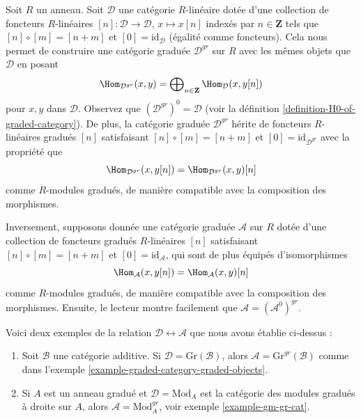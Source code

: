 \begin{remark}
\label{remark-graded-shift-functors}
Soit $R$ un anneau. Soit $\mathcal{D}$ une catégorie $R$-linéaire dotée d'une
collection de foncteurs $R$-linéaires $[n] : \mathcal{D} \to \mathcal{D}$, $x
\mapsto x[n]$ indexés par $n \in \mathbf{Z}$ tels que $[n]
\circ [m] = [n + m]$ et $[0] = \text{id}_\mathcal{D}$ (égalité comme
foncteurs). Cela nous permet de construire une catégorie graduée $\mathcal{D}^{gr}$ sur
$R$ avec les mêmes objets que $\mathcal{D}$ en posant
$$
\Hom_{\mathcal{D}^{gr}}(x, y) =
\bigoplus\nolimits_{n \in \mathbf{Z}} \Hom_\mathcal{D}(x, y[n])
$$
pour $x, y$ dans $\mathcal{D}$. Observez que $(\mathcal{D}^{gr})^0 = \mathcal{D}$
(voir la définition \ref{definition-H0-of-graded-category}). De plus, la catégorie
graduée $\mathcal{D}^{gr}$ hérite de foncteurs $R$-linéaires gradués
$[n]$ satisfaisant $[n] \circ [m] = [n + m]$ et $[0] = \text{id}_{\mathcal{D}^{gr}}$
avec la propriété que
$$
\Hom_{\mathcal{D}^{gr}}(x, y[n]) = \Hom_{\mathcal{D}^{gr}}(x, y)[n]
$$
comme $R$-modules gradués, de manière compatible avec la composition des morphismes.

\medskip\noindent
Inversement, supposons donnée une catégorie graduée $\mathcal{A}$ sur $R$
dotée d'une collection de foncteurs gradués $R$-linéaires
$[n]$ satisfaisant $[n] \circ [m] = [n + m]$ et $[0] =
\text{id}_\mathcal{A}$, qui sont de plus équipés d'isomorphismes
$$
\Hom_\mathcal{A}(x, y[n]) = \Hom_\mathcal{A}(x, y)[n]
$$
comme $R$-modules gradués, de manière compatible avec la composition des
morphismes. Ensuite, le lecteur montre facilement que $\mathcal{A} = (\mathcal{A}^0)^{gr}$.

\medskip\noindent
Voici deux exemples de la relation
$\mathcal{D} \leftrightarrow \mathcal{A}$ que nous avons établie ci-dessus :
\begin{enumerate}
\item Soit $\mathcal{B}$ une catégorie additive. Si
$\mathcal{D} = \text{Gr}(\mathcal{B})$, alors
$\mathcal{A} = \text{Gr}^{gr}(\mathcal{B})$ comme dans
l'exemple \ref{example-graded-category-graded-objects}.
\item Si $A$ est un anneau gradué et $\mathcal{D} = \text{Mod}_A$
est la catégorie des modules gradués à droite sur $A$,
alors $\mathcal{A} = \text{Mod}^{gr}_A$, voir exemple \ref{example-gm-gr-cat}.
\end{enumerate}
\end{remark}






